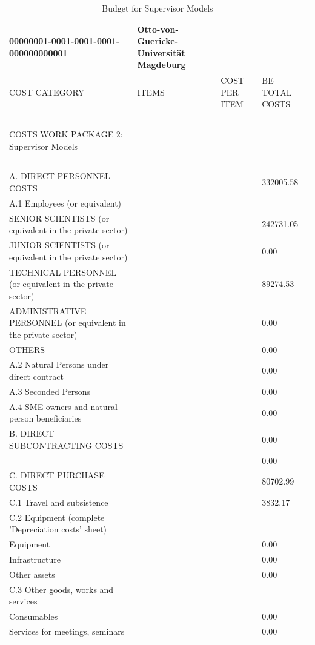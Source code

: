 \begin{table}[H]
\centering
\caption{Budget for Supervisor Models}
\begin{tabular}{|l|l|l|l|}
\hline
00000001-0001-0001-0001-000000000001 & Otto-von-Guericke-Universität Magdeburg & ~ & ~ \\ \hline
COST CATEGORY & ITEMS & COST PER ITEM & BE TOTAL COSTS \\ \hline
~ & ~ & ~ & ~ \\ \hline
COSTS WORK PACKAGE 2: Supervisor Models & ~ & ~ & ~ \\ \hline
~ & ~ & ~ & ~ \\ \hline
A. DIRECT PERSONNEL COSTS & ~ & ~ & 332005.58 \\ \hline
A.1 Employees (or equivalent) & ~ & ~ & ~ \\ \hline
SENIOR SCIENTISTS (or equivalent in the private sector) & ~ & ~ & 242731.05 \\ \hline
JUNIOR SCIENTISTS (or equivalent in the private sector) & ~ & ~ & 0.00 \\ \hline
TECHNICAL PERSONNEL (or equivalent in the private sector) & ~ & ~ & 89274.53 \\ \hline
ADMINISTRATIVE PERSONNEL (or equivalent in the private sector) & ~ & ~ & 0.00 \\ \hline
OTHERS & ~ & ~ & 0.00 \\ \hline
A.2 Natural Persons under direct contract & ~ & ~ & 0.00 \\ \hline
A.3 Seconded Persons & ~ & ~ & 0.00 \\ \hline
A.4 SME owners and natural person beneficiaries & ~ &  & 0.00 \\ \hline
B. DIRECT SUBCONTRACTING COSTS & ~ & ~ & 0.00\\ \hline
~ & ~ & ~ & 0.00 \\ \hline
C. DIRECT PURCHASE COSTS & ~ & ~ & 80702.99 \\ \hline
C.1 Travel and subsistence & ~ &  & 3832.17 \\ \hline
C.2 Equipment (complete 'Depreciation costs' sheet) & ~ & ~ & ~ \\ \hline
Equipment & ~ &  & 0.00 \\ \hline
Infrastructure & ~ &  & 0.00 \\ \hline
Other assets & ~ &  & 0.00 \\ \hline
C.3 Other goods, works and services & ~ & ~ & ~ \\ \hline
Consumables & ~ &  & 0.00 \\ \hline
Services for meetings, seminars & ~ & ~ & 0.00 \\ \hline

\end{tabular}
\end{table}
